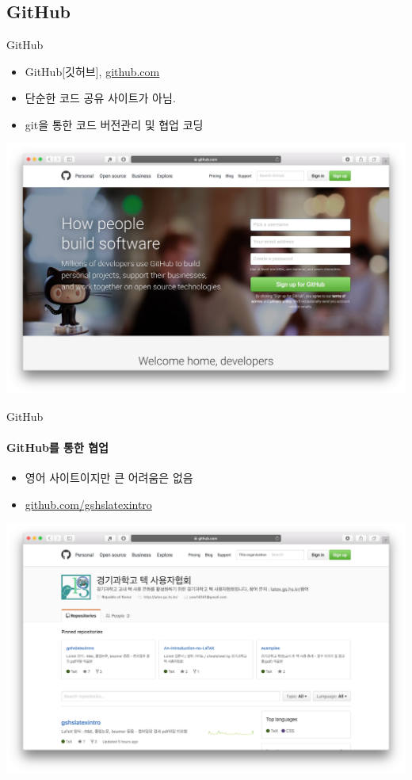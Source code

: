 \documentclass[12pt]{beamer}
\begin{document}
\subsection{GitHub}
\begin{frame}{GitHub}
	\begin{itemize}
		\item GitHub[깃허브], \url{github.com}
		\item 단순한 코드 공유 사이트가 아님.
		\item git을 통한 코드 버전관리 및 협업 코딩
	\end{itemize}
	\begin{center}
		\includegraphics[width=\textwidth]{GitHub_website.png}
	\end{center}
\end{frame}
\begin{frame}{GitHub}
	\framesubtitle{GitHub를 통한 협업}
	\begin{itemize}
		\item 영어 사이트이지만 큰 어려움은 없음
		\item \url{github.com/gshslatexintro}
	\end{itemize}
	\begin{center}
		\includegraphics[width=\textwidth]{GitHub_gshslatexintro.png}
	\end{center}
\end{frame}
\end{document}
